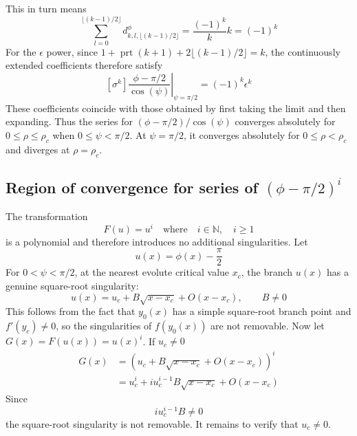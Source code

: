 \documentclass[a4paper]{amsart}
\DeclareMathOperator{\prt}{prt}
\begin{document}
This in turn means
\begin{equation*}
\sum_{l=0}^{\lfloor(k-1)/2\rfloor}d^\phi_{k,l,\lfloor(k-1)/2\rfloor}=\frac{(-1)^k}{k}k=(-1)^k
\end{equation*}
For the $\epsilon$ power, since $1+\prt(k+1)+2\lfloor(k-1)/2\rfloor=k$, the continuously extended coefficients therefore satisfy
\begin{equation*}
\left.[\sigma^k]\frac{\phi-\pi/2}{\cos(\psi)}\right|_{\psi=\pi/2}
=(-1)^k\epsilon^k
\end{equation*}
These coefficients coincide with those obtained by first taking the limit and then expanding. Thus the series for $(\phi-\pi/2)/\cos(\psi)$ converges absolutely for $0\leq\rho\leq\rho_c$ when $0\leq\psi<\pi/2$. At $\psi=\pi/2$, it converges absolutely for $0\leq\rho<\rho_c$ and diverges at $\rho=\rho_c$.


\subsection{Region of convergence for series of \texorpdfstring{$(\phi-\pi/2)^i$}{(φ - π/2) to the power i}}\label{sec:conv_powers}
The transformation
\begin{equation*}
F(u) = u^{i}\quad\text{where}\quad i\in\mathbb{N},\quad i\geq 1
\end{equation*}
is a polynomial and therefore introduces no additional singularities.
Let
\begin{equation*}
u(x)=\phi(x)-\frac{\pi}{2}
\end{equation*}
For $0<\psi<\pi/2$, at the nearest evolute critical value $x_c$, the branch $u(x)$ has a genuine square-root singularity:
\begin{equation*}
u(x)=u_c+B\sqrt{x-x_c}+O(x-x_c),\qquad B\neq0
\end{equation*}
This follows from the fact that $y_0(x)$ has a simple square-root branch point and $f'(y_c)\neq0$, so the singularities of $f(y_0(x))$ are not removable.
%
Now let $G(x)=F(u(x))=u(x)^i$. If $u_c\neq0$
\begin{align}
G(x)&=\left(u_c+B\sqrt{x-x_c}+O(x-x_c)\right)^i\nonumber\\
&=u_c^i+i u_c^{i-1}B\sqrt{x-x_c}+O(x-x_c)\label{eq:power_roc_structure}
\end{align}
Since
\begin{equation*}
i u_c^{i-1}B\neq0
\end{equation*}
the square-root singularity is not removable. It remains to verify that $u_c\neq0$.
\end{document}

